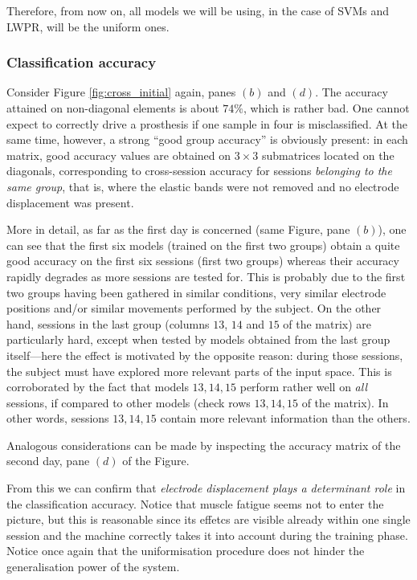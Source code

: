 Therefore, from now on, all models we will be using, in the case of
SVMs and LWPR, will be the uniform ones.

\subsubsection{Classification accuracy}

Consider Figure \ref{fig:cross_initial} again, panes $(b)$ and
$(d)$. The accuracy attained on non-diagonal elements is about
$74\%$, which is rather bad. One cannot expect to correctly drive
a prosthesis if one sample in four is misclassified. At the same
time, however, a strong ``good group accuracy'' is obviously
present: in each matrix, good accuracy values are obtained on
$3\times3$ submatrices located on the diagonals, corresponding to
cross-session accuracy for sessions \emph{belonging to the same
group}, that is, where the elastic bands were not removed and no
electrode displacement was present.

More in detail, as far as the first day is concerned (same Figure,
pane $(b)$), one can see that the first six models (trained on the
first two groups) obtain a quite good accuracy on the first six
sessions (first two groups) whereas their accuracy rapidly degrades as
more sessions are tested for. This is probably due to the first two
groups having been gathered in similar conditions, very similar
electrode positions and/or similar movements performed by the
subject. On the other hand, sessions in the last group (columns $13$,
$14$ and $15$ of the matrix) are particularly hard, except when tested
by models obtained from the last group itself---here the effect is
motivated by the opposite reason: during those sessions, the subject
must have explored more relevant parts of the input space. This is
corroborated by the fact that models $13,14,15$ perform rather well on
\emph{all} sessions, if compared to other models (check rows
$13,14,15$ of the matrix). In other words, sessions $13,14,15$ contain
more relevant information than the others.

Analogous considerations can be made by inspecting the accuracy matrix
of the second day, pane $(d)$ of the Figure.

From this we can confirm that \emph{electrode displacement plays a
determinant role} in the classification accuracy. Notice that
muscle fatigue seems not to enter the picture, but this is
reasonable since its effetcs are visible already within one single
session and the machine correctly takes it into account during the
training phase. Notice once again that the uniformisation
procedure does not hinder the generalisation power of the system.

